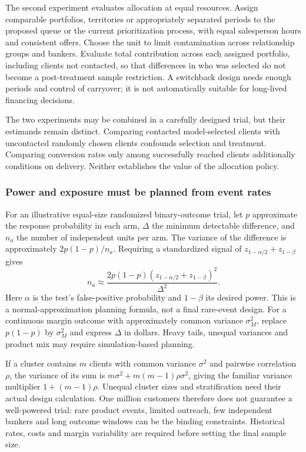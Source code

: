 The second experiment evaluates allocation at equal resources. Assign comparable portfolios, territories or appropriately separated periods to the proposed queue or the current prioritization process, with equal salesperson hours and consistent offers. Choose the unit to limit contamination across relationship groups and bankers. Evaluate total contribution across each assigned portfolio, including clients not contacted, so that differences in who was selected do not become a post-treatment sample restriction. A switchback design needs enough periods and control of carryover; it is not automatically suitable for long-lived financing decisions.

The two experiments may be combined in a carefully designed trial, but their estimands remain distinct. Comparing contacted model-selected clients with uncontacted randomly chosen clients confounds selection and treatment. Comparing conversion rates only among successfully reached clients additionally conditions on delivery. Neither establishes the value of the allocation policy.

\subsubsection{Power and exposure must be planned from event rates}

For an illustrative equal-size randomized binary-outcome trial, let $p$ approximate the response probability in each arm, $\Delta$ the minimum detectable difference, and $n_a$ the number of independent units per arm. The variance of the difference is approximately $2p(1-p)/n_a$. Requiring a standardized signal of $z_{1-\alpha/2}+z_{1-\beta}$ gives
\begin{equation}
 n_a\approx\frac{2p(1-p)(z_{1-\alpha/2}+z_{1-\beta})^2}{\Delta^2}.
 \label{eq:power}
\end{equation}
Here $\alpha$ is the test's false-positive probability and $1-\beta$ its desired power. This is a normal-approximation planning formula, not a final rare-event design. For a continuous margin outcome with approximately common variance $\sigma_M^2$, replace $p(1-p)$ by $\sigma_M^2$ and express $\Delta$ in dollars. Heavy tails, unequal variances and product mix may require simulation-based planning.

If a cluster contains $m$ clients with common variance $\sigma^2$ and pairwise correlation $\rho$, the variance of its sum is $m\sigma^2+m(m-1)\rho\sigma^2$, giving the familiar variance multiplier $1+(m-1)\rho$. Unequal cluster sizes and stratification need their actual design calculation. One million customers therefore does not guarantee a well-powered trial: rare product events, limited outreach, few independent bankers and long outcome windows can be the binding constraints. Historical rates, costs and margin variability are required before setting the final sample size.

